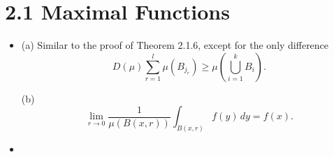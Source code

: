 \newcommand{\>}{\hspace{0.12em}}

\section*{2.1 Maximal Functions}

\begin{itemize}
\item[2.1.1]

(a) Similar to the proof of Theorem 2.1.6, except for the only difference 
$$D(\mu)\sum_{r=1}^l\mu(B_{j_r})\geq \mu(\bigcup_{i=1}^k B_i).$$

(b) $$\lim_{r\rightarrow0}\frac{1}{\mu(B(x,r))}\int_{B(x,r)}f(y)\,dy=f(x).$$

\item[2.1.2]


\end{itemize}
